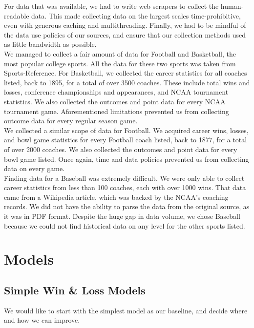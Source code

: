 \documentclass[titlepage]{article}
\begin{document}
\noindent For data that was available, we had to write web scrapers to collect the human-readable data. This made collecting data on the largest scales time-prohibitive, even with generous caching and multithreading. Finally, we had to be mindful of the data use policies of our sources, and ensure that our collection methods used as little bandwidth as possible.
\\

\noindent We managed to collect a fair amount of data for Football and Basketball, the most popular college sports. All the data for these two sports was taken from Sports-Reference. For Basketball, we collected the career statistics for all coaches listed, back to 1895, for a total of over 3500 coaches. These include total wins and losses, conference championships and appearances, and NCAA tournament statistics. We also collected the outcomes and point data for every NCAA tournament game. Aforementioned limitations prevented us from collecting outcome data for every regular season game. 
\\

\noindent We collected a similar scope of data for Football. We acquired career wins, losses, and bowl game statistics for every Football coach listed, back to 1877, for a total of over 2000 coaches. We also collected the outcomes and point data for every bowl game listed. Once again, time and data policies prevented us from collecting data on every game.
\\

\noindent Finding data for a Baseball was extremely difficult. We were only able to collect career statistics from less than 100 coaches, each with over 1000 wins. That data came from a Wikipedia article, which was backed by the NCAA's coaching records. We did not have the ability to parse the data from the original source, as it was in PDF format. Despite the huge gap in data volume, we chose Baseball because we could not find historical data on any level for the other sports listed.


\section{Models}

\subsection{Simple Win \& Loss Models}

We would like to start with the simplest model as our baseline, and decide where and how we can improve.
\\
\end{document}

